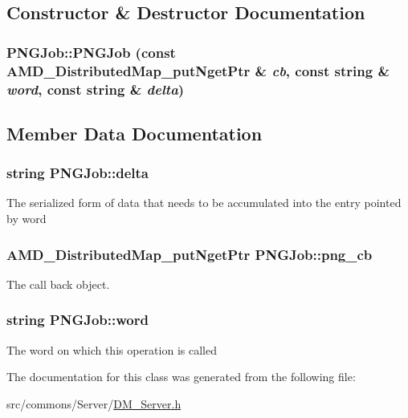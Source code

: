 \subsection{Constructor \& Destructor Documentation}
\hypertarget{class_p_n_g_job_ac11a419aaeb0086fa6580f0f11c44db0}{
\subsubsection[{PNGJob}]{\setlength{\rightskip}{0pt plus 5cm}PNGJob::PNGJob (const AMD\_\-DistributedMap\_\-putNgetPtr \& {\em cb}, \/  const string \& {\em word}, \/  const string \& {\em delta})}}
\label{class_p_n_g_job_ac11a419aaeb0086fa6580f0f11c44db0}


\subsection{Member Data Documentation}
\hypertarget{class_p_n_g_job_a98b48618013386d8882f8e8f20db297f}{
\subsubsection[{delta}]{\setlength{\rightskip}{0pt plus 5cm}string {\bf PNGJob::delta}}}
\label{class_p_n_g_job_a98b48618013386d8882f8e8f20db297f}
The serialized form of data that needs to be accumulated into the entry pointed by word \hypertarget{class_p_n_g_job_adcdd819579a1e45da875aefb5bd72954}{
\subsubsection[{png\_\-cb}]{\setlength{\rightskip}{0pt plus 5cm}AMD\_\-DistributedMap\_\-putNgetPtr {\bf PNGJob::png\_\-cb}}}
\label{class_p_n_g_job_adcdd819579a1e45da875aefb5bd72954}


The call back object. 

\hypertarget{class_p_n_g_job_a7223a76a5e6fde2dcaeab8186e22c805}{
\subsubsection[{word}]{\setlength{\rightskip}{0pt plus 5cm}string {\bf PNGJob::word}}}
\label{class_p_n_g_job_a7223a76a5e6fde2dcaeab8186e22c805}
The word on which this operation is called 

The documentation for this class was generated from the following file:\begin{DoxyCompactItemize}
\item 
src/commons/Server/\hyperlink{_d_m___server_8h}{DM\_\-Server.h}\end{DoxyCompactItemize}
